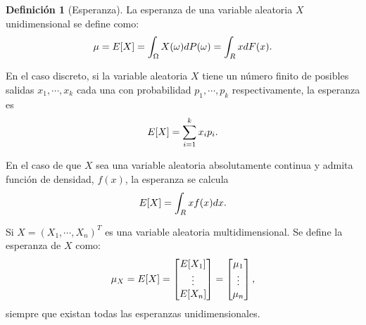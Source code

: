 \documentclass[10pt,a4paper]{article} %
\let\mathbb\relax
\theoremstyle{definition}
\newtheorem{definition}{Definición}[section]
\begin{document}
\begin{definition}[Esperanza]
  La esperanza de una variable aleatoria $X$ unidimensional se define como:\[
\mu = \mathbb{E}[X] = \int_{\Omega}X(\omega)dP(\omega) = \int_{\mathbb{R}}xdF(x).
\]

En el caso discreto, si la variable aleatoria $X$ tiene un número finito de posibles salidas $x_1,\cdots,x_k$ cada una con probabilidad $p_1,\cdots, p_k$ respectivamente, la esperanza es\[
\mathbb{E}[X] = \sum_{i=1}^kx_ip_i.
\]

En el caso de que $X$ sea una variable aleatoria absolutamente continua y admita función de densidad, $f(x)$, la esperanza se calcula\[
\mathbb{E}[X] = \int_{\mathbb{R}}xf(x)dx.
\]
  
  Si  $X=(X_1,\cdots,X_n)^T$ es una variable aleatoria multidimensional. Se define la esperanza de $X$ como:\[
\mu_X = \mathbb{E}[X] = \begin{bmatrix}
           \mathbb{E}[X_1] \\
          \vdots \\
          \mathbb{E}[X_n]
         \end{bmatrix}
 = \begin{bmatrix}
           \mu_1 \\
          \vdots \\
          \mu_n
 \end{bmatrix},  \]
 siempre que existan todas las esperanzas unidimensionales.
\end{definition}
\end{document}
